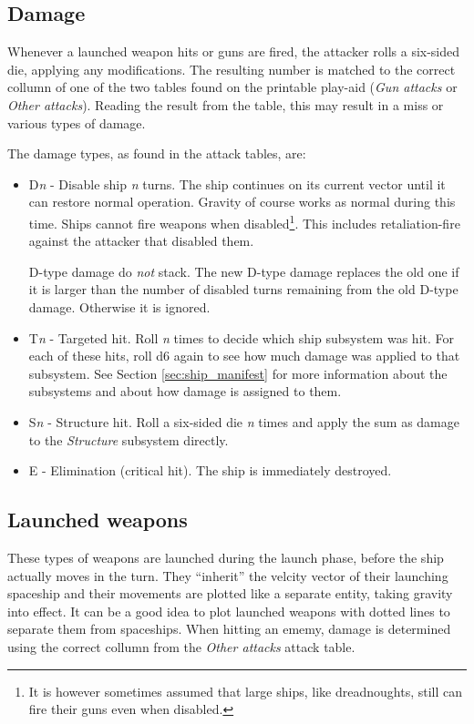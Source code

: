 \documentclass[a4paper,12pt,notitlepage,twocolumn]{article}
\begin{document}
\subsection{Damage}
\label{sec:damage}

Whenever a launched weapon hits or guns are fired, the attacker rolls
a six-sided die, applying 
any modifications. The resulting number is matched to the correct
collumn of one of the two tables found on the printable
play-aid (\emph{Gun attacks} or \emph{Other attacks}).
Reading the result from the table, this may result in a miss or
various types of damage. 

The damage types, as found in the attack tables, are: 
\begin{itemize}
\item D\emph{n} - Disable ship \emph{n} turns. The ship continues on
  its current vector until it can restore normal operation. Gravity
  of course works as normal during this time. Ships
  cannot fire weapons when disabled\footnote{It is however sometimes assumed
    that large ships, like dreadnoughts, still can fire their guns even
    when disabled.}. This includes retaliation-fire against the
  attacker that disabled them.

  D-type damage do \emph{not} stack. The new D-type damage replaces the old
  one if it is larger than the number of disabled turns remaining from
  the old D-type damage. Otherwise it is ignored.
\item T\emph{n} - Targeted hit. Roll \emph{n} times to decide which
  ship subsystem was hit. For each of these hits, roll d6 again to see
  how much damage was applied to that subsystem. See Section
  \ref{sec:ship_manifest} for more information about the subsystems
  and about how damage is assigned to them. 
\item S\emph{n} - Structure hit. Roll a six-sided die \emph{n} times
  and apply the sum as damage to the \emph{Structure} subsystem directly.
\item E - Elimination (critical hit). The ship is immediately destroyed. 
\end{itemize}

\subsection{Launched weapons}
\label{sec:damage_launched_weapons}
These types of weapons are launched during the launch
phase, before the ship actually moves in the turn. 
They ``inherit'' the velcity vector of their launching
spaceship and their movements are plotted like a separate entity,
taking gravity into effect. It can be a good idea to plot launched
weapons with dotted lines to separate them from spaceships. When
hitting an ememy, damage is determined using the correct collumn from
the \emph{Other attacks} attack table.  
\end{document}
